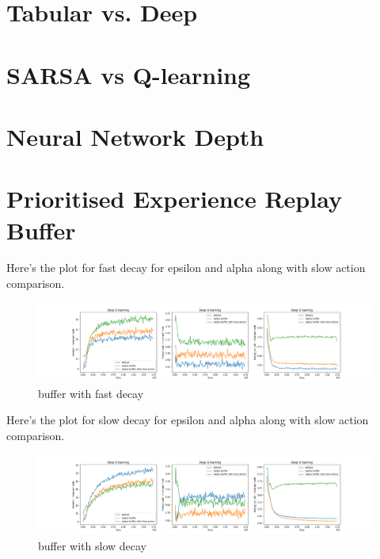 


\section{Tabular vs. Deep}
\section{SARSA vs Q-learning}
\section{Neural Network Depth}
\section{Prioritised Experience Replay Buffer}

Here's the plot for fast decay for epsilon and alpha along with slow action comparison.

\begin{figure}[H]
\centering
\hspace*{-3.3cm}  
\includegraphics[scale=0.40]{plots/replay_buffer/replay_buffer_with_slow_action_traversal_fast_decay_deep_q_SMALL.png}
  \caption{buffer with fast decay}
\end{figure}

Here's the plot for slow decay for epsilon and alpha along with slow action comparison.

\begin{figure}[H]
\centering
\hspace*{-3.3cm}  
\includegraphics[scale=0.40]{plots/replay_buffer/replay_buffer_with_slow_action_traversal_deep_q_SMALL.png}
  \caption{buffer with slow decay}
\end{figure}


